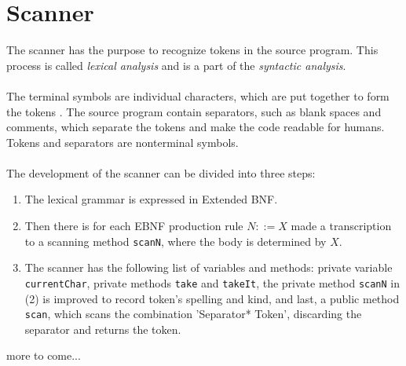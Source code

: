 \section{Scanner}
The scanner has the purpose to recognize tokens in the source program. This process is called \textit{lexical analysis} and is a part of the \textit{syntactic analysis}.
\\
\\
The terminal symbols are individual characters, which are put together to form the tokens \cite{misc:spo}. The source program contain separators, such as blank spaces and comments, which separate the tokens and make the code readable for humans. Tokens and separators are nonterminal symbols.
\\
\\
The development of the scanner can be divided into three steps:
\begin{enumerate}
\item The lexical grammar is expressed in Extended BNF.
\item Then there is for each EBNF production rule $N::=X$ made a transcription to a scanning method \texttt{scanN}, where the body is determined by $X$.
\item The scanner has the following list of variables and methods: private variable \texttt{currentChar}, private methods \texttt{take} and \texttt{takeIt}, the private method \texttt{scanN} in (2) is improved to record token's spelling and kind, and last, a public method \texttt{scan}, which scans the combination 'Separator* Token', discarding the separator and returns the token.
\end{enumerate}
more to come...